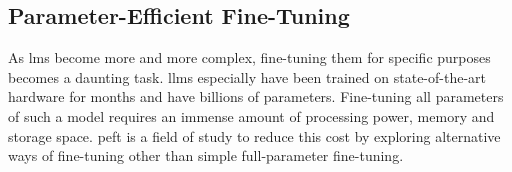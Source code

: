 \subsection{Parameter-Efficient Fine-Tuning}
\label{sec:peft}

As \acp{lm} become more and more complex, fine-tuning them for specific purposes becomes a daunting task.
\acp{llm} especially have been trained on state-of-the-art hardware for months and have billions of parameters.
Fine-tuning all parameters of such a model requires an immense amount of processing power, memory and storage space.
\ac{peft} is a field of study to reduce this cost by exploring alternative ways of fine-tuning other than simple full-parameter fine-tuning.


